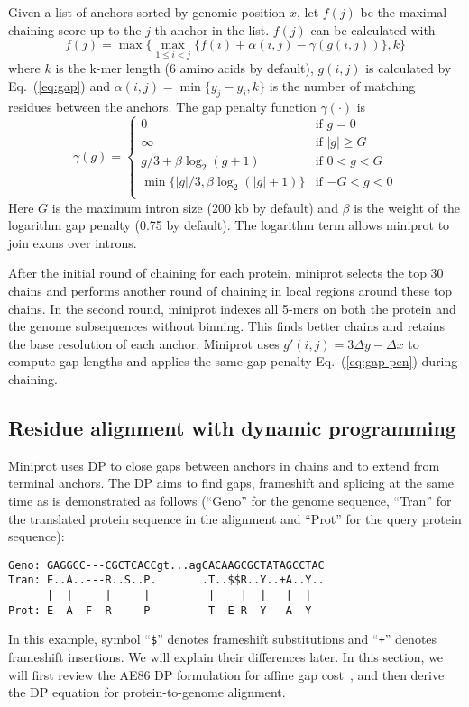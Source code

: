 \documentclass{bioinfo}
\begin{document}
\begin{methods}
Given a list of anchors sorted by genomic position $x$, let $f(j)$ be the
maximal chaining score up to the $j$-th anchor in the list. $f(j)$ can be
calculated with
\begin{equation}
f(j)=\max\big\{\max_{1\le i<j}\{f(i)+\alpha(i,j)-\gamma(g(i,j))\},k\big\}
\end{equation}
where $k$ is the k-mer length (6 amino acids by default), $g(i,j)$
is calculated by Eq.~(\ref{eq:gap}) and $\alpha(i,j)=\min\{y_j-y_i,k\}$ is the
number of matching residues between the anchors. The gap penalty function
$\gamma(\cdot)$ is
\begin{equation}\label{eq:gap-pen}
\gamma(g)=\left\{\begin{array}{ll}
0 & \mbox{if $g=0$}\\
\infty & \mbox{if $|g|\ge G$}\\
g/3+\beta\log_2(g+1) & \mbox{if $0<g<G$}\\
\min\{|g|/3,\beta\log_2(|g|+1)\} & \mbox{if $-G<g<0$}\\
\end{array}\right.
\end{equation}
Here $G$ is the maximum intron size (200 kb by default) and $\beta$ is the
weight of the logarithm gap penalty (0.75 by default).  The logarithm term
allows miniprot to join exons over introns.

After the initial round of chaining for each protein, miniprot selects the top
30 chains and performs another round of chaining in local regions around these
top chains. In the second round, miniprot indexes all 5-mers on both the
protein and the genome subsequences without binning. This finds better chains
and retains the base resolution of each anchor. Miniprot uses $g'(i,j)=3\Delta
y-\Delta x$ to compute gap lengths and applies the same gap penalty
Eq.~(\ref{eq:gap-pen}) during chaining.

\subsection{Residue alignment with dynamic programming}

Miniprot uses DP to close gaps between anchors in chains and to extend from
terminal anchors. The DP aims to find gaps, frameshift and splicing at the
same time as is demonstrated as follows (``Geno'' for the genome sequence,
``Tran'' for the translated protein sequence in the alignment and ``Prot'' for
the query protein sequence):
\begin{verbatim}
Geno: GAGGCC---CGCTCACCgt...agCACAAGCGCTATAGCCTAC
Tran: E..A..---R..S..P.       .T..$$R..Y..+A..Y..
      |  |     |     |         |    |  |   |  |
Prot: E  A  F  R  -  P         T  E R  Y   A  Y
\end{verbatim}
In this example, symbol ``{\tt \$}'' denotes frameshift substitutions and
``{\tt +}'' denotes frameshift insertions. We will explain their differences
later. In this section, we will first review the AE86 DP formulation for affine
gap cost~\citep{Altschul:1986aa}, and then derive the DP equation for
protein-to-genome alignment.


\end{methods}
\end{document}
